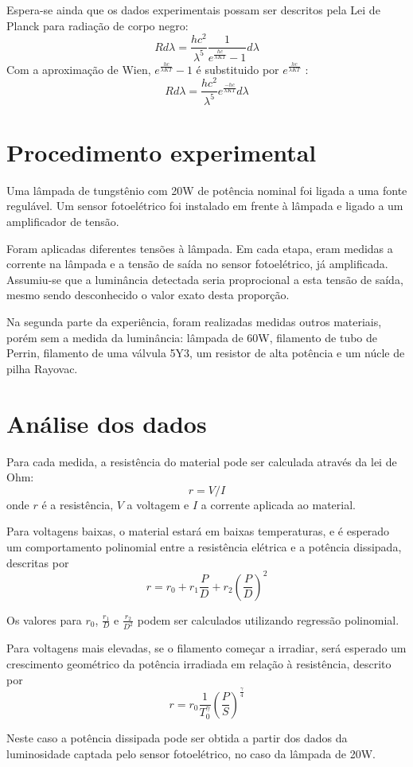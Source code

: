 \documentclass[brazilian,12pt,a4paper,final]{article}
\begin{document}
Espera-se ainda que os dados experimentais possam ser descritos pela Lei de Planck
para radiação de corpo negro:
\[
R d\lambda=\frac{hc^2}{\lambda^5}\frac{1}{e^\frac{hc}{\lambda KT}-1} d\lambda
\]
Com a aproximação de Wien, $e^\frac{hc}{\lambda KT}-1$ é substituido 
por $e^\frac{hc}{\lambda KT}$ :
\[
R d\lambda=\frac{hc^2}{\lambda^5}e^\frac{-hc}{\lambda KT} d\lambda
\]

\section{Procedimento experimental}
Uma lâmpada de tungstênio com 20W de potência nominal foi ligada a uma fonte regulável. 
Um sensor fotoelétrico foi instalado em frente à lâmpada e ligado a um amplificador de tensão.

Foram aplicadas diferentes tensões à lâmpada.
Em cada etapa, eram medidas a corrente na lâmpada e a tensão de saída no sensor fotoelétrico, já amplificada.
Assumiu-se que a luminância detectada seria proprocional a esta tensão de saída, mesmo sendo desconhecido o valor exato desta proporção.

Na segunda parte da experiência, foram realizadas medidas outros materiais, porém sem 
a medida da luminância: lâmpada de 60W, filamento de tubo de Perrin, filamento de uma válvula 5Y3, um resistor de alta potência e um núcle de pilha Rayovac.

\section{Análise dos dados}
Para cada medida, 
a resistência do material pode ser calculada 
através da lei de Ohm: 
$$ r=V/I$$ 
onde $r$ é a resistência, $V$ a voltagem e $I$ a corrente aplicada ao material. 

Para voltagens baixas, o material estará em baixas temperaturas,
e é esperado um comportamento polinomial entre a 
resistência elétrica e a potência dissipada, descritas por
$$r=r_0+r_1\frac{P}{D}+r_2(\frac{P}{D})^2$$

Os valores para $r_0$, $\frac{r_1}{D}$ e $\frac{r_2}{D^2}$
podem ser calculados
utilizando regressão polinomial.

Para voltagens mais elevadas, se o filamento começar a irradiar, 
será esperado um crescimento geométrico da 
potência irradiada em relação à resistência, descrito por
$$r=r_0\frac{1}{T_0^\gamma}(\frac{P}{S})^\frac{\gamma}{4}$$

Neste caso a potência dissipada pode ser obtida a partir dos dados da luminosidade captada
pelo sensor fotoelétrico, no caso da lâmpada de 20W.
\end{document}
